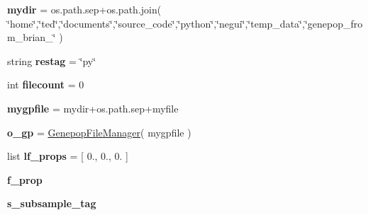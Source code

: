 \begin{DoxyCompactItemize}
\item 
{\bfseries mydir} = os.\+path.\+sep+os.\+path.\+join( \char`\"{}home\char`\"{},\char`\"{}ted\char`\"{},\char`\"{}documents\char`\"{},\char`\"{}source\+\_\+code\char`\"{},\char`\"{}python\char`\"{},\char`\"{}negui\char`\"{},\char`\"{}temp\+\_\+data\char`\"{},\char`\"{}genepop\+\_\+from\+\_\+brian\+\_\char`\"{} )\hypertarget{namespacenegui_1_1genepopfilemanager_a5f78adfa80eb047a15ce8ce7b6f7a305}{}\label{namespacenegui_1_1genepopfilemanager_a5f78adfa80eb047a15ce8ce7b6f7a305}

\item 
string {\bfseries restag} = \char`\"{}py\char`\"{}\hypertarget{namespacenegui_1_1genepopfilemanager_a00d8e3e0a24bb58a0b8ef04003bf840d}{}\label{namespacenegui_1_1genepopfilemanager_a00d8e3e0a24bb58a0b8ef04003bf840d}

\item 
int {\bfseries filecount} = 0\hypertarget{namespacenegui_1_1genepopfilemanager_a6e66afe99799ede33e8e8179f0fc19e5}{}\label{namespacenegui_1_1genepopfilemanager_a6e66afe99799ede33e8e8179f0fc19e5}

\item 
{\bfseries mygpfile} = mydir+os.\+path.\+sep+myfile\hypertarget{namespacenegui_1_1genepopfilemanager_a3c90b2473be3f81add97830760336177}{}\label{namespacenegui_1_1genepopfilemanager_a3c90b2473be3f81add97830760336177}

\item 
{\bfseries o\+\_\+gp} = \hyperlink{classnegui_1_1genepopfilemanager_1_1GenepopFileManager}{Genepop\+File\+Manager}( mygpfile )\hypertarget{namespacenegui_1_1genepopfilemanager_a53ee7221d8bd681086430de6d2c22def}{}\label{namespacenegui_1_1genepopfilemanager_a53ee7221d8bd681086430de6d2c22def}

\item 
list {\bfseries lf\+\_\+props} = \mbox{[} 0., 0., 0. \mbox{]}\hypertarget{namespacenegui_1_1genepopfilemanager_a8586276191d2a71439e3bf4b1fb6e56b}{}\label{namespacenegui_1_1genepopfilemanager_a8586276191d2a71439e3bf4b1fb6e56b}

\item 
{\bfseries f\+\_\+prop}\hypertarget{namespacenegui_1_1genepopfilemanager_a2f4e105b886f862466457835614524eb}{}\label{namespacenegui_1_1genepopfilemanager_a2f4e105b886f862466457835614524eb}

\item 
{\bfseries s\+\_\+subsample\+\_\+tag}\hypertarget{namespacenegui_1_1genepopfilemanager_a08de653f938fa6a3dac25fb8b6a09b34}{}\label{namespacenegui_1_1genepopfilemanager_a08de653f938fa6a3dac25fb8b6a09b34}


\end{DoxyCompactItemize}
